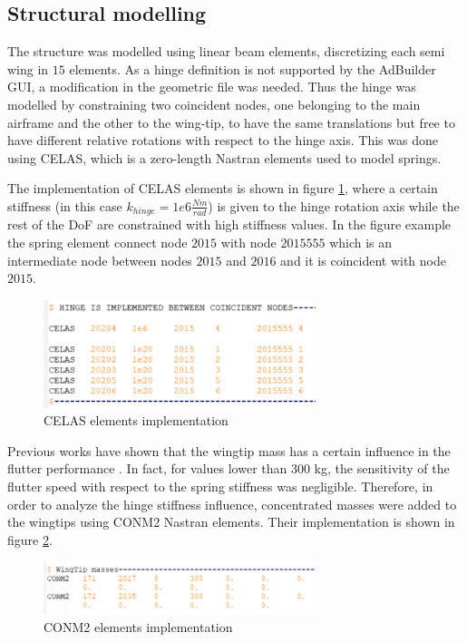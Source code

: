 \documentclass[conference]{IEEEtran}
\newlength\figureheight
\newlength\figurewidth
\begin{document}
\subsection{Structural modelling}
The structure was modelled using linear beam elements, discretizing each semi wing in $15$ elements. As a hinge definition is not supported by the AdBuilder GUI, a modification in the geometric file was needed. Thus the hinge was modelled by constraining two coincident nodes, one belonging to the main airframe and the other to the wing-tip, to have the same translations but free to have different relative rotations with respect to the hinge axis. This was done using CELAS, which is a zero-length Nastran elements used to model springs.

The implementation of CELAS elements is shown in figure \ref{fig:NastranHinge}, where a certain stiffness (in this case $k_{hinge} = 1e6 \frac{Nm}{rad}$) is given to the hinge rotation axis while the rest of the DoF are constrained with high stiffness values. In the figure example the spring element connect node $2015$ with node $2015555$ which is an intermediate node between nodes $2015$ and $2016$ and it is coincident with node $2015$.

\begin{figure}[htp]
  \centering
  \setlength\figureheight{5cm}
  \setlength\figurewidth{7cm}
  \includegraphics[width=225pt]{images/NastranHinge.png}
  \caption{CELAS elements implementation}
  \label{fig:NastranHinge}
\end{figure}

Previous works have shown that the wingtip mass has a certain influence in the flutter performance \cite{Castrichini2016}. In fact, for values lower than 300 kg, the sensitivity of the flutter speed with respect to the spring stiffness was negligible. Therefore, in order to analyze the hinge stiffness influence, concentrated masses were added to the wingtips using CONM2 Nastran elements. Their implementation is shown in figure \ref{fig:NastranCONM2}.

\begin{figure}[htp]
  \centering
  \setlength\figureheight{5cm}
  \setlength\figurewidth{7cm}
  \includegraphics[width=225pt]{images/NastranCONM2.png}
  \caption{CONM2 elements implementation}
  \label{fig:NastranCONM2}
\end{figure}
\end{document}
